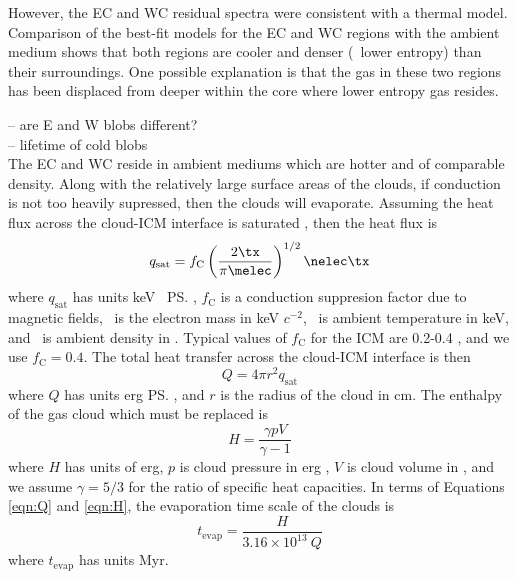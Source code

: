 \documentclass{emulateapj}
\begin{document}
However, the EC and WC residual spectra were consistent with a thermal
model. Comparison of the best-fit models for the EC and WC regions
with the ambient medium shows that both regions are cooler and denser
(\ie\ lower entropy) than their surroundings. One possible explanation
is that the gas in these two regions has been displaced from deeper
within the core where lower entropy gas resides.

-- are E and W blobs different?\\

-- lifetime of cold blobs\\

The EC and WC reside in ambient mediums which are hotter and of
comparable density. Along with the relatively large surface areas of
the clouds, if conduction is not too heavily supressed, then the
clouds will evaporate. Assuming the heat flux across the cloud-ICM
interface is saturated \citep{1977ApJ...211..135C}, then the heat flux
is
\begin{equation}
  q_{\mathrm{sat}} = f_{\mathrm{C}} \left(\frac{2 \tx}{\pi \melec}\right)^{1/2} \nelec \tx
  \label{eqn:q}
\end{equation}
where $q_{\mathrm{sat}}$ has units keV \cmsq\ \ps, $f_{\mathrm{C}}$ is
a conduction suppresion factor due to magnetic fields, \melec\ is the
electron mass in keV $c^{-2}$, \tx\ is ambient temperature in keV, and
\nelec\ is ambient density in \pcc. Typical values of $f_{\mathrm{C}}$
for the ICM are 0.2-0.4 \citep{2001ApJ...554..561M,
  2001ApJ...562L.129N}, and we use $f_{\mathrm{C}}=0.4$. The total
heat transfer across the cloud-ICM interface is then
\begin{equation}
  Q = 4 \pi r^2 q_{\mathrm{sat}}
  \label{eqn:Q}
\end{equation}
where $Q$ has units erg \ps, and $r$ is the radius of the cloud in
cm. The enthalpy of the gas cloud which must be replaced is
\begin{equation}
  H = \frac{\gamma p V}{\gamma-1}
  \label{eqn:H}
\end{equation}
where $H$ has units of erg, $p$ is cloud pressure in erg \pcc, $V$ is
cloud volume in \cc, and we assume $\gamma = 5/3$ for the ratio of
specific heat capacities. In terms of Equations \ref{eqn:Q} and
\ref{eqn:H}, the evaporation time scale of the clouds is
\begin{equation}
  t_{\mathrm{evap}} = \frac{H}{3.16\times10^{13}~Q}
\end{equation}
where $t_{\mathrm{evap}}$ has units Myr.
\end{document}
